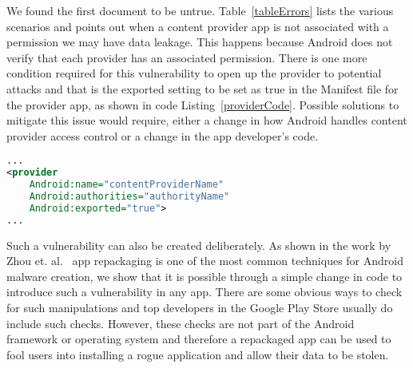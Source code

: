 \noindent
We found the first document to be untrue. Table~\ref{tableErrors} lists the various scenarios and points out when a content provider app is not associated with a permission we may have data leakage. This happens because Android does not verify that each provider has an associated permission. There is one more condition required for this vulnerability to open up the provider to potential attacks and that is the exported setting to be set as true in the Manifest file for the provider app, as shown in code Listing~\ref{providerCode}. Possible solutions to mitigate this issue would require, either a change in how Android handles content provider access control or a change in the app developer's code.

\begin{lstlisting}[caption={Provider exported tag set as true},label={providerCode},language=XML]
...
<provider
	Android:name="contentProviderName"
	Android:authorities="authorityName"
	Android:exported="true">
...
\end{lstlisting}

Such a vulnerability can also be created deliberately. As shown in the work by Zhou et. al.~\cite{Zhou2012MalwareGenomeProject} app repackaging is one of the most common techniques for Android malware creation, we show that it is possible through a simple change in code to introduce such a vulnerability in any app. There are some obvious ways to check for such manipulations and top developers in the Google Play Store usually do include such checks. However, these checks are not part of the Android framework or operating system and therefore a repackaged app can be used to fool users into installing a rogue application and allow their data to be stolen.
